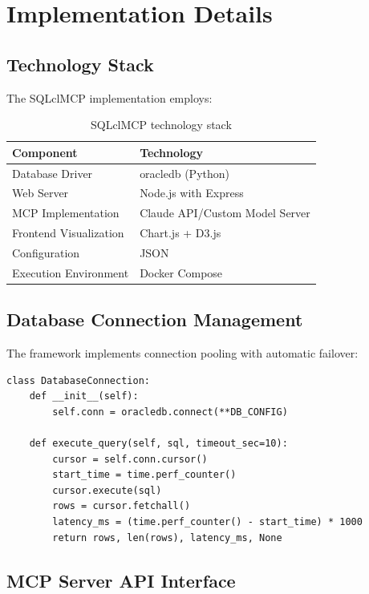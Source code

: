 \documentclass[11pt,a4paper]{article}
\begin{document}
\section{Implementation Details}

\subsection{Technology Stack}

The SQLclMCP implementation employs:

\begin{table}[h]
\centering
\begin{tabular}{ll}
\toprule
\textbf{Component} & \textbf{Technology} \\
\midrule
Database Driver & oracledb (Python) \\
Web Server & Node.js with Express \\
MCP Implementation & Claude API/Custom Model Server \\
Frontend Visualization & Chart.js + D3.js \\
Configuration & JSON \\
Execution Environment & Docker Compose \\
\bottomrule
\end{tabular}
\caption{SQLclMCP technology stack}
\label{tab:tech_stack}
\end{table}

\subsection{Database Connection Management}

The framework implements connection pooling with automatic failover:

\begin{lstlisting}[caption={Database connection initialization}]
class DatabaseConnection:
    def __init__(self):
        self.conn = oracledb.connect(**DB_CONFIG)
        
    def execute_query(self, sql, timeout_sec=10):
        cursor = self.conn.cursor()
        start_time = time.perf_counter()
        cursor.execute(sql)
        rows = cursor.fetchall()
        latency_ms = (time.perf_counter() - start_time) * 1000
        return rows, len(rows), latency_ms, None
\end{lstlisting}

\subsection{MCP Server API Interface}
\end{document}

